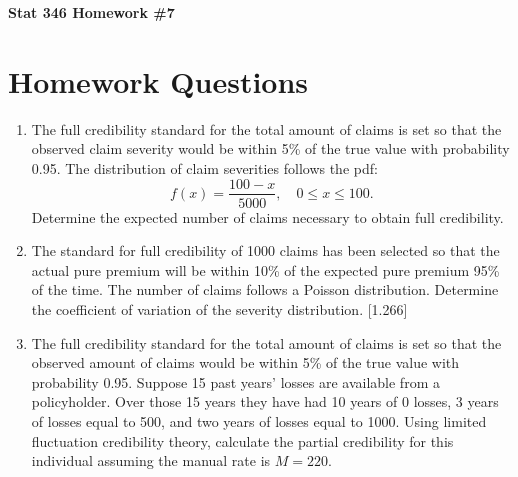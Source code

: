 \documentclass{article}
\begin{document}
\begin{center}
\textbf{Stat 346 Homework \#7}\\
\vspace{0.3in}
\end{center}

\section*{Homework Questions}

\begin{enumerate}
    \item The full credibility standard for the total amount of claims is set so that the observed claim severity would be within 5\% of the true value with probability 0.95.  The  distribution of claim severities follows the pdf:
    \[
    f(x) = \frac{100-x}{5000}, \quad 0 \leq x \leq 100.
    \]
    Determine the expected number of claims necessary to obtain full credibility. 
    
      \item The standard for full credibility of 1000 claims has been selected so that the actual pure premium will be within 10\% of the expected pure premium 95\% of the time. The number of claims follows a Poisson distribution. Determine the coefficient of variation of the severity distribution. [1.266]
    
    \item  The full credibility standard for the total amount of claims is set so that the observed amount of claims would be within 5\% of the true value with probability 0.95.
    	Suppose 15 past years' losses are available from a policyholder. Over those 15 years they have had 10 years of 0 losses, 3 years of losses equal to 500, and two years of losses equal to 1000. 
	Using limited fluctuation credibility theory, calculate the partial credibility for this individual assuming the manual rate is $M = 220$. 
    
\end{enumerate}
\end{document}
